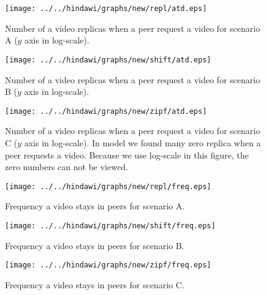
\begin{figure}[!t]
\begin{center}
\texttt{[image: ../../hindawi/graphs/new/repl/atd.eps]}
\end{center}
\caption{Number of a video replicas when a peer request a video for scenario A ($y$ axis in log-scale).}
\label{fig:atd-normal}
\end{figure}

\begin{figure}[!t]
\begin{center}
\texttt{[image: ../../hindawi/graphs/new/shift/atd.eps]}
\end{center}
\caption{Number of a video replicas when a peer request a video for scenario B ($y$ axis in log-scale).}
\label{fig:atd-shift}
\end{figure}

\begin{figure}[!t]
\begin{center}
\texttt{[image: ../../hindawi/graphs/new/zipf/atd.eps]}
\end{center}
\caption{Number of a video replicas when a peer request a video for scenario C ($y$ axis in log-scale). In model we found many zero replica when a peer requests a video. Because we use log-scale in this figure, the zero numbers can not be viewed. }
\label{fig:atd-zipf}
\end{figure}



\begin{figure}[!t]
\begin{center}
\texttt{[image: ../../hindawi/graphs/new/repl/freq.eps]}
\end{center}
\caption{Frequency a video stays in peers for scenario A.}
\label{fig:freq-normal}
\end{figure}


\begin{figure}[!t]
\begin{center}
\texttt{[image: ../../hindawi/graphs/new/shift/freq.eps]}
\end{center}
\caption{Frequency a video stays in peers for scenario B.}
\label{fig:freq-shift}
\end{figure}


\begin{figure}[!t]
\begin{center}
\texttt{[image: ../../hindawi/graphs/new/zipf/freq.eps]}
\end{center}
\caption{Frequency a video stays in peers for scenario C.}
\label{fig:freq-zipf}
\end{figure}




